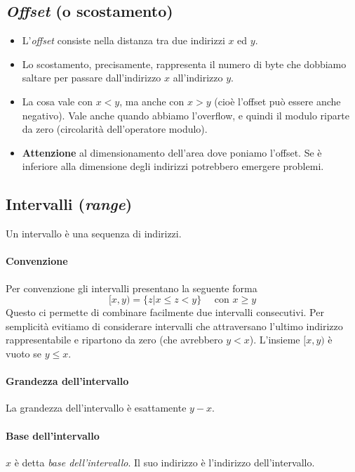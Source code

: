 \subsection{\emph{Offset} (o scostamento)}
\begin{itemize}
	\item L'\emph{offset} consiste nella distanza tra due indirizzi $x$ ed $y$. 
	\item Lo scostamento, precisamente, rappresenta il numero di byte che dobbiamo saltare per passare dall'indirizzo $x$ all'indirizzo $y$. 
	\item La cosa vale con $x<y$, ma anche con $x>y$ (cioè l'offset può essere anche negativo). Vale anche quando abbiamo l'overflow, e quindi il modulo riparte da zero (circolarità dell'operatore modulo).
	\item \textbf{Attenzione} al dimensionamento dell'area dove poniamo l'offset. Se è inferiore alla dimensione degli indirizzi potrebbero emergere problemi.
\end{itemize}
\clearpage 

\subsection{Intervalli (\emph{range})} 
Un intervallo è una sequenza di indirizzi.
\paragraph{Convenzione}
Per convenzione gli intervalli presentano la seguente forma
\[[x,y)=\{z|x \leq z < y\}\,\,\,\,\,\,\,\,\text{con $x \geq y$}\]
Questo ci permette di combinare facilmente due intervalli consecutivi. Per semplicità evitiamo di considerare intervalli che attraversano l'ultimo indirizzo rappresentabile e ripartono da zero (che avrebbero $y<x$). L'insieme $[x,y)$ è vuoto se $y\leq x$.
\paragraph{Grandezza dell'intervallo} La grandezza dell'intervallo è esattamente $y-x$.
\paragraph{Base dell'intervallo} $x$ è detta \emph{base dell'intervallo}. Il suo indirizzo è l'indirizzo dell'intervallo.
